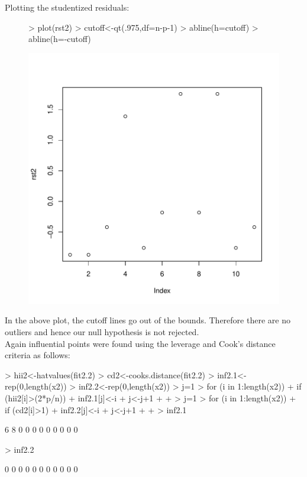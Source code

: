 \documentclass[12pt]{article}
\begin{document}
\begin{itemize}
Plotting the studentized residuals:
\begin{figure}[H]
\begin{Schunk}
\begin{Sinput}
> plot(rst2)
> cutoff<-qt(.975,df=n-p-1)
> abline(h=cutoff)
> abline(h=-cutoff)
\end{Sinput}
\end{Schunk}
\includegraphics{HW6-015}
\end{figure}

In the above plot, the cutoff lines go out of the bounds. Therefore there are no outliers and hence our null hypothesis is not rejected.\\

Again influential points were found using the leverage and Cook's distance criteria as follows:

\begin{Schunk}
\begin{Sinput}
> hii2<-hatvalues(fit2.2)
> cd2<-cooks.distance(fit2.2)
> inf2.1<-rep(0,length(x2))
> inf2.2<-rep(0,length(x2))
> j=1
> for (i in 1:length(x2)){
+   if (hii2[i]>(2*p/n)){
+     inf2.1[j]<-i
+     j<-j+1
+   }
+ }
> j=1
> for (i in 1:length(x2)){
+   if (cd2[i]>1){
+     inf2.2[j]<-i
+     j<-j+1
+   }
+ }
> inf2.1
\end{Sinput}
\begin{Soutput}
 [1] 6 8 0 0 0 0 0 0 0 0 0
\end{Soutput}
\begin{Sinput}
> inf2.2
\end{Sinput}
\begin{Soutput}
 [1] 0 0 0 0 0 0 0 0 0 0 0
\end{Soutput}
\end{Schunk}
\clearpage


\end{itemize}
\end{document}
